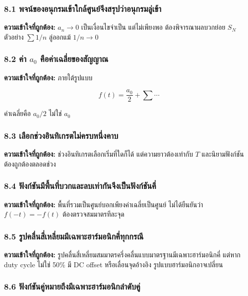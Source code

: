 \subsubsection{8.1 พจน์ของอนุกรมเข้าใกล้ศูนย์จึงสรุปว่าอนุกรมลู่เข้า}

\textbf{ความเข้าใจที่ถูกต้อง:} \(a_n\to0\) เป็นเงื่อนไขจำเป็น แต่ไม่เพียงพอ ต้องพิจารณาผลบวกย่อย \(S_N\) ตัวอย่าง \(\sum1/n\) ลู่ออกแม้ \(1/n\to0\)

\subsubsection[8.2 ค่า a0 คือค่าเฉลี่ยของสัญญาณ]{8.2 ค่า \(a_0\) คือค่าเฉลี่ยของสัญญาณ}

\textbf{ความเข้าใจที่ถูกต้อง:} ภายใต้รูปแบบ

\[
f(t)=\frac{a_0}{2}+\sum\cdots
\]

ค่าเฉลี่ยคือ \(a_0/2\) ไม่ใช่ \(a_0\)

\subsubsection{8.3 เลือกช่วงอินทิเกรตไม่ครบหนึ่งคาบ}

\textbf{ความเข้าใจที่ถูกต้อง:} ช่วงอินทิเกรตเลือกเริ่มที่ใดก็ได้ แต่ความยาวต้องเท่ากับ \(T\) และนิยามฟังก์ชันต้องถูกต้องตลอดช่วง

\subsubsection{8.4 ฟังก์ชันมีพื้นที่บวกและลบเท่ากันจึงเป็นฟังก์ชันคี่}

\textbf{ความเข้าใจที่ถูกต้อง:} พื้นที่รวมเป็นศูนย์บอกเพียงค่าเฉลี่ยเป็นศูนย์ ไม่ได้ยืนยันว่า \(f(-t)=-f(t)\) ต้องตรวจสมมาตรทีละจุด

\subsubsection{8.5 รูปคลื่นสี่เหลี่ยมมีเฉพาะฮาร์มอนิกคี่ทุกกรณี}

\textbf{ความเข้าใจที่ถูกต้อง:} รูปคลื่นสี่เหลี่ยมสมมาตรครึ่งคลื่นแบบมาตรฐานมีเฉพาะฮาร์มอนิกคี่ แต่หาก duty cycle ไม่ใช่ 50\% มี DC offset หรือเลื่อนจุดอ้างอิง รูปแบบฮาร์มอนิกอาจเปลี่ยน

\subsubsection{8.6 ฟังก์ชันคู่หมายถึงมีเฉพาะฮาร์มอนิกลำดับคู่}

